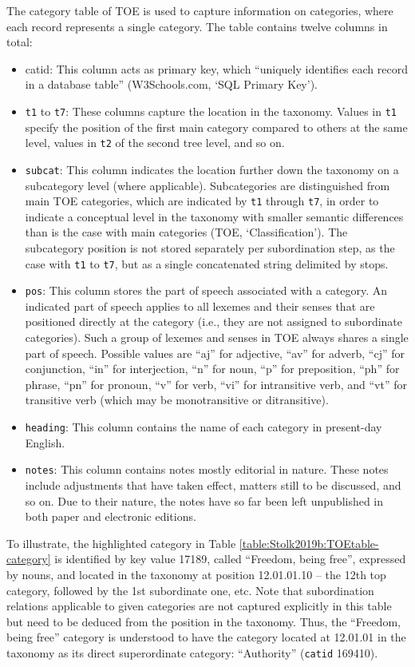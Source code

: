 The category table of TOE is used to capture information on categories, where each record represents a single category. The table contains twelve columns in total:
\begin{itemize}
\item catid: This column acts as primary key, which “uniquely identifies each record in a database table” (W3Schools.com, ‘SQL Primary Key’). 
\item \texttt{t1} to \texttt{t7}: These columns capture the location in the taxonomy. Values in \texttt{t1} specify the position of the first main category compared to others at the same level, values in \texttt{t2} of the second tree level, and so on.
\item \texttt{subcat}: This column indicates the location further down the taxonomy on a subcategory level (where applicable). Subcategories are distinguished from main TOE categories, which are indicated by \texttt{t1} through \texttt{t7}, in order to indicate a conceptual level in the taxonomy with smaller semantic differences than is the case with main categories (TOE, ‘Classification’). The subcategory position is not stored separately per subordination step, as the case with \texttt{t1} to \texttt{t7}, but as a single concatenated string delimited by stops.
\item \texttt{pos}: This column stores the part of speech associated with a category. An indicated part of speech applies to all lexemes and their senses that are positioned directly at the category (i.e., they are not assigned to subordinate categories). Such a group of lexemes and senses in TOE always shares a single part of speech. Possible values are “aj” for adjective, “av” for adverb, “cj” for conjunction, “in” for interjection, “n” for noun, “p” for preposition, “ph” for phrase, “pn” for pronoun, “v” for verb, “vi” for intransitive verb, and “vt” for transitive verb (which may be monotransitive or ditransitive). 
\item \texttt{heading}: This column contains the name of each category in present-day English.
\item \texttt{notes}: This column contains notes mostly editorial in nature. These notes include adjustments that have taken effect, matters still to be discussed, and so on. Due to their nature, the notes have so far been left unpublished in both paper and electronic editions.
\end{itemize}

To illustrate, the highlighted category in Table \ref{table:Stolk2019b:TOEtable-category} is identified by key value 17189, called “Freedom, being free”, expressed by nouns, and located in the taxonomy at position 12.01.01.10 – the 12th top category, followed by the 1st subordinate one, etc. Note that subordination relations applicable to given categories are not captured explicitly in this table but need to be deduced from the position in the taxonomy. Thus, the “Freedom, being free” category is understood to have the category located at 12.01.01 in the taxonomy as its direct superordinate category: “Authority” (\texttt{catid} 169410). 

